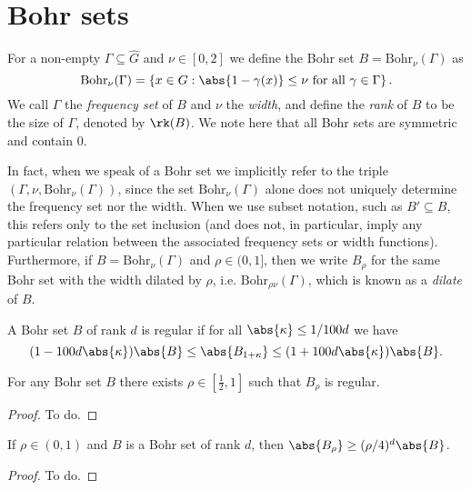 \chapter{Bohr sets}

\begin{definition}
For a non-empty $\Gamma\subseteq \widehat{G}$ and $\nu\in [0,2]$ we define the Bohr set $B=\mathrm{Bohr}_\nu(\Gamma)$ as 
\[\mathrm{Bohr}_\nu(\Gamma)=\left\{ x\in G : \abs{1-\gamma(x)}\leq \nu\textrm{ for all }\gamma\in\Gamma\right\}.\]
We call $\Gamma$ the \emph{frequency set} of $B$ and $\nu$ the \emph{width}, and define the \emph{rank} of $B$ to be the size of $\Gamma$, denoted by $\rk(B)$. We note here that all Bohr sets are symmetric and contain $0$.

In fact, when we speak of a Bohr set we implicitly refer to the triple $(\Gamma,\nu,\mathrm{Bohr}_\nu(\Gamma))$, since the set $\mathrm{Bohr}_{\nu}(\Gamma)$ alone does not uniquely determine the frequency set nor the width. When we use subset notation, such as $B'\subseteq B$, this refers only to the set inclusion (and does not, in particular, imply any particular relation between the associated frequency sets or width functions). Furthermore, if $B=\mathrm{Bohr}_\nu(\Gamma)$ and $\rho\in(0,1]$, then we write $B_\rho$ for the same Bohr set with the width dilated by $\rho$, i.e. $\mathrm{Bohr}_{\rho\nu}(\Gamma)$, which is known as a \emph{dilate} of $B$.
\end{definition}

\begin{definition}[Regularity]
A Bohr set $B$ of rank $d$ is regular if for all $\abs{\kappa}\leq 1/100d$ we have 
\[(1-100 d\abs{\kappa})\abs{B}\leq \abs{B_{1+\kappa}}\leq(1+ 100 d\abs{\kappa})\abs{B}.\]
\end{definition}

\begin{lemma}\label{bohr-regular}
For any Bohr set $B$ there exists $\rho\in[\tfrac{1}{2},1]$ such that $B_\rho$ is regular.
\end{lemma}
\begin{proof}
To do.
\end{proof}

\begin{lemma}\label{bohr-size}
If $\rho\in (0,1)$ and $B$ is a Bohr set of rank $d$, then $\abs{B_\rho}\geq (\rho/4)^d\abs{B}$.
\end{lemma}
\begin{proof}
To do.
\end{proof}

